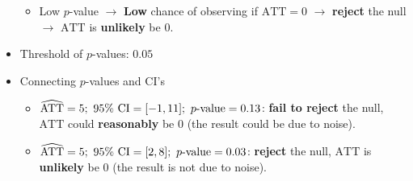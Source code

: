 \documentclass[10pt, letterpaper]{article}
\def\ATT{\mathrm{ATT}}
\def\CI{\mathrm{CI}}
\begin{document}
\begin{itemize}
\begin{itemize}
		\item Low $p$-value $\rightarrow$ \textbf{Low} chance of observing if $\ATT=0$ $\rightarrow$ \textbf{reject} the null $\rightarrow$ $\ATT$ is \textbf{unlikely} be $0$.
	\end{itemize}
	\item Threshold of $p$-values: $0.05$
	\item Connecting $p$-values and $\CI$'s
	\begin{itemize}
		\item $\widehat{\ATT}=5;\ 95\%\ \CI=\qty[-1,11];\ p\text{-value}=0.13$: \textbf{fail to reject} the null, $\ATT$ could \textbf{reasonably} be $0$ (the result could be due to noise).
		\item $\widehat{\ATT}=5;\ 95\%\ \CI=\qty[2,8];\ p\text{-value}=0.03$: \textbf{reject} the null, $\ATT$ is \textbf{unlikely} be $0$ (the result is not due to noise).
	\end{itemize}
\end{itemize}

\label{LastPage}
\end{document}
